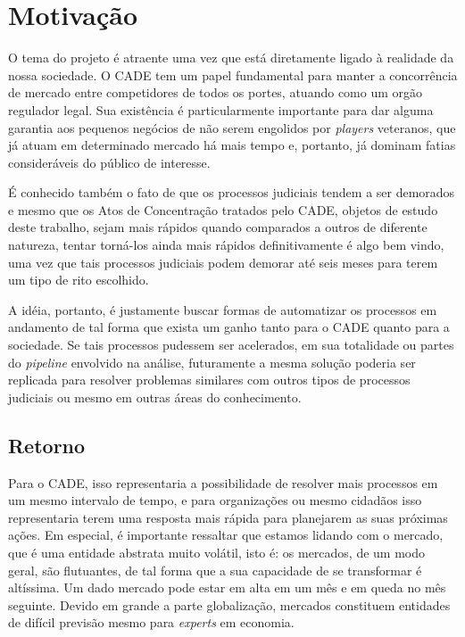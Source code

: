\documentclass[11pt]{report}
\begin{document}
\section{Motivação}
\indent\indent O tema do projeto é atraente uma vez que está diretamente ligado à realidade da nossa sociedade. O CADE tem um papel
fundamental para manter a concorrência de mercado entre competidores de todos os portes, atuando como um orgão regulador legal. Sua existência é
particularmente importante para dar alguma garantia aos pequenos negócios de não serem engolidos por \textit{players} veteranos, que
já atuam em determinado mercado há mais tempo e, portanto, já dominam fatias consideráveis do público de interesse.

É conhecido também o fato de que os processos judiciais tendem a ser demorados e mesmo que os Atos de Concentração tratados pelo CADE, objetos de estudo deste
trabalho, sejam mais rápidos quando comparados a outros de diferente natureza, tentar torná-los ainda mais rápidos definitivamente é algo bem vindo, uma vez que
tais processos judiciais podem demorar até seis meses para terem um tipo de rito escolhido.

A idéia, portanto, é justamente buscar formas de automatizar os processos em andamento de tal forma que exista um ganho tanto para o CADE quanto para a sociedade.
Se tais processos pudessem ser acelerados, em sua totalidade ou partes do \textit{pipeline} envolvido na análise, futuramente a mesma solução poderia ser replicada
para resolver problemas similares com outros tipos de processos judiciais ou mesmo em outras áreas do conhecimento.

\subsection{Retorno}

\indent\indent Para o CADE, isso representaria a possibilidade de resolver mais processos em um mesmo intervalo de tempo, e para organizações ou mesmo cidadãos isso representaria
terem uma resposta mais rápida para planejarem as suas próximas ações. Em especial, é importante ressaltar que estamos lidando com o mercado, que é uma
entidade abstrata muito volátil, isto é: os mercados, de um modo geral, são flutuantes, de tal forma que a sua capacidade de se transformar é altíssima.
Um dado mercado pode estar em alta em um mês e em queda no mês seguinte. Devido em grande a parte globalização, mercados constituem entidades de difícil previsão
mesmo para \textit{experts} em economia.
\end{document}

